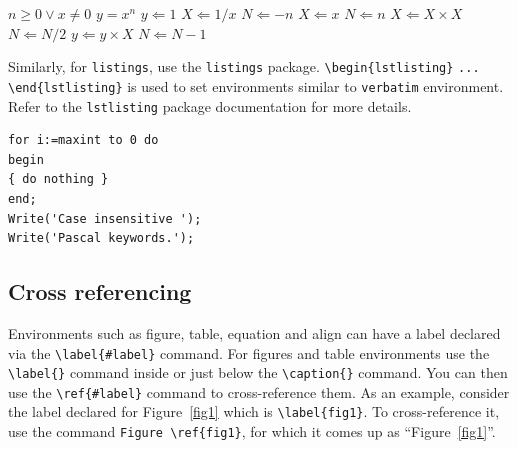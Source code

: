 \documentclass[ml4h-mathphys]{ml4h-jnl}%
\theoremstyle{thmstyleone}%
\theoremstyle{thmstyletwo}%
\theoremstyle{thmstylethree}%
\begin{document}
\begin{algorithm}
\caption{Calculate $y = x^n$}\label{algo1}
\begin{algorithmic}[1]
\Require $n \geq 0 \vee x \neq 0$
\Ensure $y = x^n$ 
\State $y \Leftarrow 1$
\label{algln2}
        \State $X \Leftarrow 1 / x$
        \State $N \Leftarrow -n$
\Else
        \State $X \Leftarrow x$
        \State $N \Leftarrow n$
\EndIf
{}
            \State $X \Leftarrow X \times X$
            \State $N \Leftarrow N / 2$
        \Else[$N$ is odd]
            \State $y \Leftarrow y \times X$
            \State $N \Leftarrow N - 1$
        \EndIf
\EndWhile
\end{algorithmic}
\end{algorithm}
\bigskip

Similarly, for \verb+listings+, use the \verb+listings+ package. \verb+\begin{lstlisting}+ \verb+...+ \verb+\end{lstlisting}+ is used to set environments similar to \verb+verbatim+ environment. Refer to the \verb+lstlisting+ package documentation for more details.

\bigskip
\begin{minipage}{\hsize}%
\lstset{frame=single,framexleftmargin=-1pt,framexrightmargin=-17pt,framesep=12pt,linewidth=0.98\textwidth,language=pascal}%
\begin{lstlisting}
for i:=maxint to 0 do
begin
{ do nothing }
end;
Write('Case insensitive ');
Write('Pascal keywords.');
\end{lstlisting}
\end{minipage}

\subsection{Cross referencing}\label{sec8}

Environments such as figure, table, equation and align can have a label
declared via the \verb+\label{#label}+ command. For figures and table
environments use the \verb+\label{}+ command inside or just
below the \verb+\caption{}+ command. You can then use the
\verb+\ref{#label}+ command to cross-reference them. As an example, consider
the label declared for Figure~\ref{fig1} which is
\verb+\label{fig1}+. To cross-reference it, use the command 
\verb+Figure \ref{fig1}+, for which it comes up as
``Figure~\ref{fig1}''. 
\end{document}
